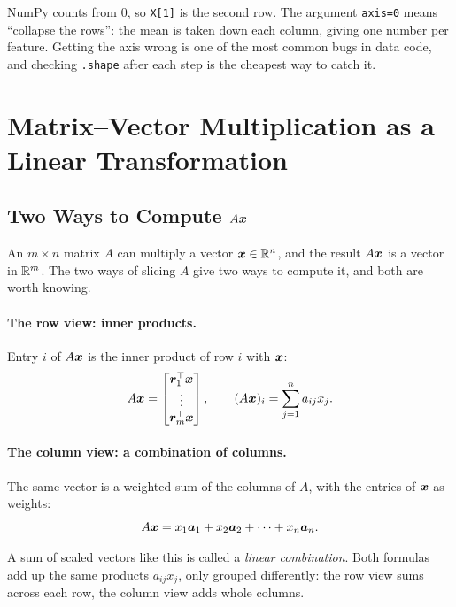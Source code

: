 NumPy counts from $0$, so \texttt{X[1]} is the second row. The argument
\texttt{axis=0} means ``collapse the rows'': the mean is taken down each
column, giving one number per feature. Getting the axis wrong is one of
the most common bugs in data code, and checking \texttt{.shape} after
each step is the cheapest way to catch it.

\section{Matrix--Vector Multiplication as a Linear Transformation}
\label{sec:ch03-matvec}

\subsection{Two Ways to Compute \texorpdfstring{$A\bm{x}$}{Ax}}
\label{sec:ch03-two-views}

An $m \times n$ matrix $A$ can multiply a vector $\bm{x} \in \mathbb{R}^n$, and
the result $A\bm{x}$ is a vector in $\mathbb{R}^m$. The two ways of slicing $A$
give two ways to compute it, and both are worth knowing.

\paragraph{The row view: inner products.}
Entry $i$ of $A\bm{x}$ is the inner product of row $i$ with $\bm{x}$:
\begin{equation}
  A\bm{x} =
  \begin{bmatrix}
    \bm{r}_1^\top \bm{x} \\ \vdots \\ \bm{r}_m^\top \bm{x}
  \end{bmatrix},
  \qquad
  (A\bm{x})_i = \sum_{j=1}^n a_{ij} x_j .
  \label{eq:ch03-row-view}
\end{equation}

\paragraph{The column view: a combination of columns.}
The same vector is a weighted sum of the columns of $A$, with the entries
of $\bm{x}$ as weights:
\begin{equation}
  A\bm{x} = x_1 \bm{a}_1 + x_2 \bm{a}_2 + \dots + x_n \bm{a}_n .
  \label{eq:ch03-col-view}
\end{equation}

A sum of scaled vectors like this is called a \emph{linear combination}.
Both formulas add up the same products $a_{ij} x_j$, only grouped
differently: the row view sums across each row, the column view adds
whole columns.

